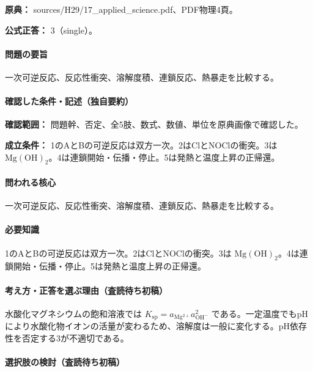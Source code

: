 \noindent\textbf{原典：} sources/H29/17\_applied\_science.pdf、PDF物理4頁。

\textbf{公式正答：} 3（single）。

\paragraph{問題の要旨} 一次可逆反応、反応性衝突、溶解度積、連鎖反応、熱暴走を比較する。

\paragraph{確認した条件・記述（独自要約）}\mbox{}\par

\noindent\textbf{確認範囲：} 問題幹、否定、全5肢、数式、数値、単位を原典画像で確認した。\par

\noindent\textbf{成立条件：} 1のAとBの可逆反応は双方一次。2はClとNOClの衝突。3は \(\mathrm{Mg(OH)_2}\)。4は連鎖開始・伝播・停止。5は発熱と温度上昇の正帰還。\par

\paragraph{問われる核心} 一次可逆反応、反応性衝突、溶解度積、連鎖反応、熱暴走を比較する。

\paragraph{必要知識} 1のAとBの可逆反応は双方一次。2はClとNOClの衝突。3は \(\mathrm{Mg(OH)_2}\)。4は連鎖開始・伝播・停止。5は発熱と温度上昇の正帰還。

\paragraph{考え方・正答を選ぶ理由（査読待ち初稿）} 水酸化マグネシウムの飽和溶液では \(K_{\mathrm{sp}}=a_{\mathrm{Mg^{2+}}}a_{\mathrm{OH^-}}^2\) である。一定温度でもpHにより水酸化物イオンの活量が変わるため、溶解度は一般に変化する。pH依存性を否定する3が不適切である。

\paragraph{選択肢の検討（査読待ち初稿）}\mbox{}\par

